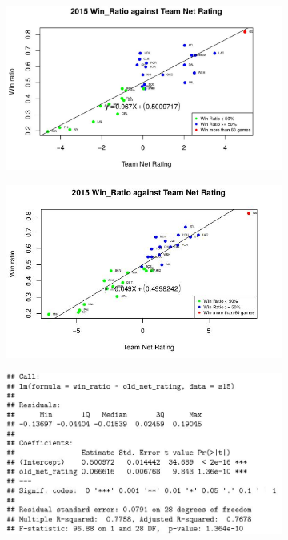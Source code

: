 \documentclass[11pt]{article}
\begin{document}
\begin{figure}[h!]
  \centering
  \begin{subfigure}[b]{0.45\linewidth}
    \includegraphics[width=\linewidth]{nr_15.jpg}
  \end{subfigure}
  \begin{subfigure}[b]{0.45\linewidth}
    \includegraphics[width=\linewidth]{new_nr_15.jpg}
  \end{subfigure}
  \begin{subfigure}[b]{0.42\linewidth}
    \includegraphics[width=\linewidth]{nr_15_summary.jpg}

\end{subfigure}
\end{figure}
\end{document}
